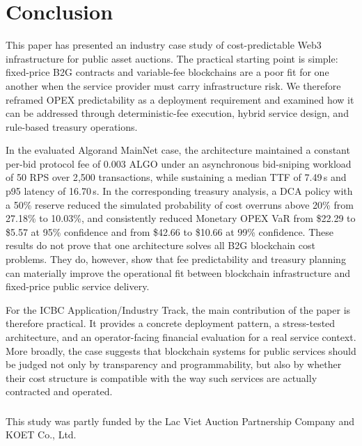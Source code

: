 \documentclass[runningheads]{llncs}
\begin{document}
\section{Conclusion}

This paper has presented an industry case study of cost-predictable Web3
infrastructure for public asset auctions. The practical starting point is simple:
fixed-price B2G contracts and variable-fee blockchains are a poor fit for one
another when the service provider must carry infrastructure risk. We therefore
reframed OPEX predictability as a deployment requirement and examined how it
can be addressed through deterministic-fee execution, hybrid service design, and
rule-based treasury operations.

In the evaluated Algorand MainNet case, the architecture maintained a constant per-bid
protocol fee of 0.003 ALGO under an asynchronous bid-sniping workload of 50 RPS over
2{,}500 transactions, while sustaining a median TTF of 7.49\,s and p95 latency of
16.70\,s. In the corresponding treasury analysis, a DCA policy with a 50\% reserve reduced
the simulated probability of cost overruns above 20\% from 27.18\% to 10.03\%,
and consistently reduced Monetary OPEX VaR from \$22.29 to \$5.57 at 95\% confidence
and from \$42.66 to \$10.66 at 99\% confidence. These results do not
prove that one architecture solves all B2G blockchain cost problems. They do,
however, show that fee predictability and treasury planning can materially improve
the operational fit between blockchain infrastructure and fixed-price public
service delivery.

For the ICBC Application/Industry Track, the main contribution of the paper is
therefore practical. It provides a concrete deployment pattern, a stress-tested
architecture, and an operator-facing financial evaluation for a real service
context. More broadly, the case suggests that blockchain systems for public
services should be judged not only by transparency and programmability, but
also by whether their cost structure is compatible with the way such services are
actually contracted and operated.


\begin{credits}
\subsubsection{\ackname} This study was partly funded by the Lac Viet Auction Partnership Company and KOET Co., Ltd.
\end{credits}
\end{document}
